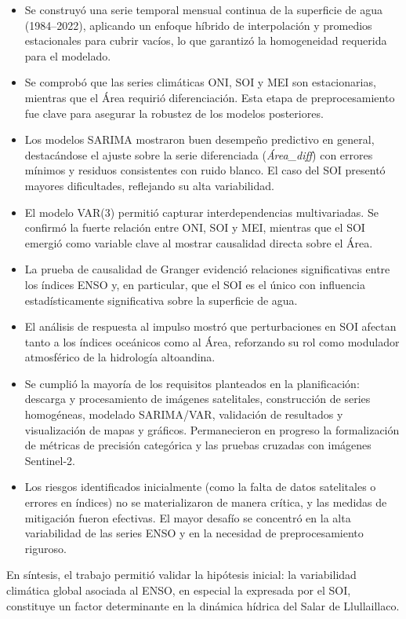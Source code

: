 \begin{itemize}
    \item Se construyó una serie temporal mensual continua de la superficie de agua (1984--2022), aplicando un enfoque híbrido de interpolación y promedios estacionales para cubrir vacíos, lo que garantizó la homogeneidad requerida para el modelado.
    \item Se comprobó que las series climáticas ONI, SOI y MEI son estacionarias, mientras que el Área requirió diferenciación. Esta etapa de preprocesamiento fue clave para asegurar la robustez de los modelos posteriores.
    \item Los modelos SARIMA mostraron buen desempeño predictivo en general, destacándose el ajuste sobre la serie diferenciada (\emph{Área\_diff}) con errores mínimos y residuos consistentes con ruido blanco. El caso del SOI presentó mayores dificultades, reflejando su alta variabilidad.
    \item El modelo VAR(3) permitió capturar interdependencias multivariadas. Se confirmó la fuerte relación entre ONI, SOI y MEI, mientras que el SOI emergió como variable clave al mostrar causalidad directa sobre el Área.
    \item La prueba de causalidad de Granger evidenció relaciones significativas entre los índices ENSO y, en particular, que el SOI es el único con influencia estadísticamente significativa sobre la superficie de agua.
    \item El análisis de respuesta al impulso mostró que perturbaciones en SOI afectan tanto a los índices oceánicos como al Área, reforzando su rol como modulador atmosférico de la hidrología altoandina.
    \item Se cumplió la mayoría de los requisitos planteados en la planificación: descarga y procesamiento de imágenes satelitales, construcción de series homogéneas, modelado SARIMA/VAR, validación de resultados y visualización de mapas y gráficos. Permanecieron en progreso la formalización de métricas de precisión categórica y las pruebas cruzadas con imágenes Sentinel-2.
    \item Los riesgos identificados inicialmente (como la falta de datos satelitales o errores en índices) no se materializaron de manera crítica, y las medidas de mitigación fueron efectivas. El mayor desafío se concentró en la alta variabilidad de las series ENSO y en la necesidad de preprocesamiento riguroso.
\end{itemize}

En síntesis, el trabajo permitió validar la hipótesis inicial: la variabilidad climática global asociada al ENSO, en especial la expresada por el SOI, constituye un factor determinante en la dinámica hídrica del Salar de Llullaillaco.

